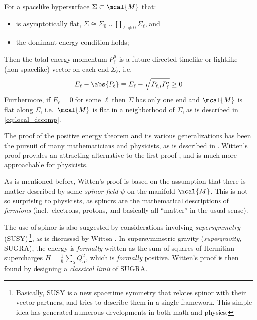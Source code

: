 \documentclass[a4paper,11pt]{article}
\begin{document}
	\begin{theorem*}
		For a spacelike hypersurface $\Sigma\subset\mcal{M}$ that:
		\begin{itemize}[noitemsep,topsep=.3\baselineskip]
		\item is asymptotically flat, $
			\Sigma \cong \Sigma_0
			\cup \coprod_{\ell\ne 0} \Sigma_\ell
		$, and
		\item the dominant energy condition holds; 
		\end{itemize}
		Then the total energy-momentum $P^\mu_\ell$ is a future directed timelike or lightlike (non-spacelike) vector on each end $\Sigma_\ell$, i.e.~
		\begin{equation}
			E_\ell - \abs{P_\ell}
			\equiv E_\ell
				- \sqrt{P_{\ell,i} P^i_\ell}
			\ge 0
		\end{equation}
		Furthermore, if $E_\ell = 0$ for some $\ell$ then ${\Sigma}$ has only one end and $\mcal{M}$ is flat along $\Sigma$, i.e.~$\mcal{M}$ is flat in a neighborhood of $\Sigma$, as is described in \eqref{eq:local_decomp}. 
	\end{theorem*}
	
	The proof of the positive energy theorem and its various generalizations has been the pursuit of many mathematicians and physicists, as is described in \cite{Witten:1981mf}. Witten's proof provides an attracting alternative to the first proof \cite{Schon:1979rg}, and is much more approachable for physicists. 
	
	As is mentioned before, Witten's proof is based on the assumption that there is matter described by some \textit{spinor field} $\psi$ on the manifold $\mcal{M}$. This is not so surprising to physicists, as spinors are the mathematical descriptions of \textit{fermions} (incl.~electrons, protons, and basically all ``matter'' in the usual sense). 
	
	The use of spinor is also suggested by considerations involving \textit{supersymmetry} (SUSY)\,\footnote{
		Basically, SUSY is a new spacetime symmetry that relates spinor with their vector partners, and tries to describe them in a single framework. This simple idea has generated numerous developments in both math and physics. 
	}, as is discussed by Witten \cite{Witten:1981mf}. In supersymmetric gravity (\textit{supergravity}, SUGRA), the energy is \textit{formally} written as the sum of squares of Hermitian supercharges $H = \frac{1}{\hbar}\sum_\alpha Q_\alpha^2$, which is \textit{formally} positive. Witten's proof is then found by designing a \textit{classical limit} of SUGRA. 
	
\end{document}
